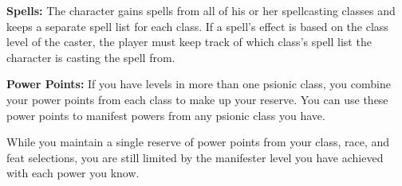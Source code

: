 \textbf{Spells:} The character gains spells from all of his or her spellcasting classes and keeps a separate spell list for each class. If a spell's effect is based on the class level of the caster, the player must keep track of which class's spell list the character is casting the spell from.

\textbf{Power Points:} If you have levels in more than one psionic class, you combine your power points from each class to make up your reserve. You can use these power points to manifest powers from any psionic class you have.

While you maintain a single reserve of power points from your class, race, and feat selections, you are still limited by the manifester level you have achieved with each power you know.